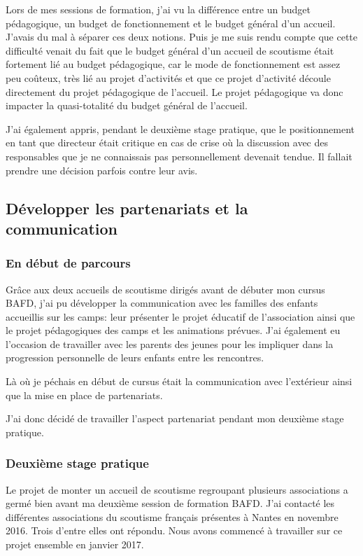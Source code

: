 \documentclass[titlepage,11pt,a4paper]{article}
\begin{document}
Lors de mes sessions de formation, j'ai vu la différence entre un budget pédagogique, un
budget de fonctionnement et le budget général d'un accueil. J'avais du mal à séparer ces deux notions. Puis je
me suis rendu compte que cette difficulté venait du fait que le budget général d'un
accueil de scoutisme était fortement lié au budget pédagogique, car le mode de
fonctionnement est assez peu coûteux, très lié au projet d'activités et que ce projet
d'activité découle directement du projet pédagogique de l'accueil. Le projet pédagogique
va donc impacter la quasi-totalité du budget général de l'accueil.

J'ai également appris, pendant le deuxième stage pratique, que le positionnement en tant
que directeur était critique en cas de crise où la discussion avec des responsables que je
ne connaissais pas personnellement devenait tendue. Il fallait prendre une décision
parfois contre leur avis.


\subsection{Développer les partenariats et la communication}
\subsubsection{En début de parcours}

Grâce aux deux accueils de scoutisme dirigés avant de débuter mon cursus BAFD, j'ai
pu développer la communication avec les familles des enfants accueillis sur les camps:
leur présenter le projet éducatif de l'association ainsi que le projet pédagogiques des
camps et les animations prévues. J'ai également eu l'occasion de travailler avec les parents des jeunes pour les impliquer
dans la progression personnelle de leurs enfants entre les rencontres.

Là où je péchais en début de cursus était la communication avec l'extérieur ainsi que la
mise en place de partenariats.

J'ai donc décidé de travailler l'aspect partenariat pendant mon deuxième stage pratique.

\subsubsection{Deuxième stage pratique}

Le projet de monter un accueil de scoutisme regroupant plusieurs associations a germé bien avant ma
deuxième session de formation BAFD\@. J'ai contacté les différentes associations du
scoutisme français présentes à Nantes en novembre 2016. Trois d'entre elles ont répondu.
Nous avons commencé à travailler sur ce projet ensemble en janvier 2017.
\end{document}
